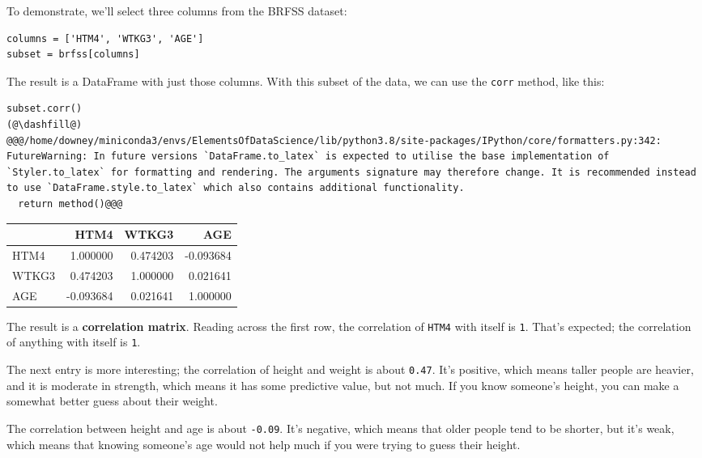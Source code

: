 To demonstrate, we'll select three columns from the BRFSS dataset:

\begin{lstlisting}[]
columns = ['HTM4', 'WTKG3', 'AGE']
subset = brfss[columns]
\end{lstlisting}

The result is a DataFrame with just those columns. With this subset of
the data, we can use the \passthrough{\lstinline!corr!} method, like
this:

\begin{lstlisting}[]
subset.corr()
(@\dashfill@)
@@@/home/downey/miniconda3/envs/ElementsOfDataScience/lib/python3.8/site-packages/IPython/core/formatters.py:342: FutureWarning: In future versions `DataFrame.to_latex` is expected to utilise the base implementation of `Styler.to_latex` for formatting and rendering. The arguments signature may therefore change. It is recommended instead to use `DataFrame.style.to_latex` which also contains additional functionality.
  return method()@@@
\end{lstlisting}

\begin{tabular}{lrrr}
\midrule
{} &      HTM4 &     WTKG3 &       AGE \\
\midrule
HTM4  &  1.000000 &  0.474203 & -0.093684 \\
WTKG3 &  0.474203 &  1.000000 &  0.021641 \\
AGE   & -0.093684 &  0.021641 &  1.000000 \\
\midrule
\end{tabular}

The result is a \textbf{correlation matrix}. Reading across the first
row, the correlation of \passthrough{\lstinline!HTM4!} with itself is
\passthrough{\lstinline!1!}. That's expected; the correlation of
anything with itself is \passthrough{\lstinline!1!}.

The next entry is more interesting; the correlation of height and weight
is about \passthrough{\lstinline!0.47!}. It's positive, which means
taller people are heavier, and it is moderate in strength, which means
it has some predictive value, but not much. If you know someone's
height, you can make a somewhat better guess about their weight.

The correlation between height and age is about
\passthrough{\lstinline!-0.09!}. It's negative, which means that older
people tend to be shorter, but it's weak, which means that knowing
someone's age would not help much if you were trying to guess their
height.

